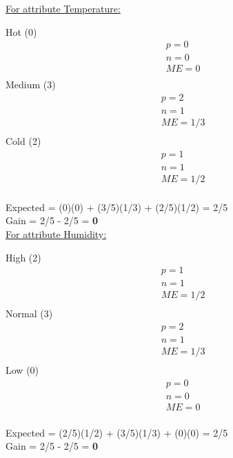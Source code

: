 \documentclass[8pt, fullpage,letterpaper]{article}
\begin{document}
\begin{enumerate}
\begin{enumerate}
\begin{enumerate}
\begin{enumerate}
\begin{itemize}
						\underline {For attribute Temperature:} 
							\vspace{-5pt}
							\begin{multicols}{3}
								Hot (0)
			 						\begin{align*}
									    	& p = 0\\
										& n = 0 \\
									    	& ME = 0\\
								      \end{align*}
								Medium (3)
			 						\begin{align*}
									    	& p = 2\\
										& n = 1 \\
									    	& ME = 1/3\\
								      \end{align*}
								Cold (2)
			 						\begin{align*}
									    	& p = 1\\
										& n = 1 \\
									    	& ME = 1/2\\
								      \end{align*}
							\end{multicols}
							\vspace{-20pt}
							Expected = (0)(0) + (3/5)(1/3) + (2/5)(1/2) = 2/5\\
							Gain = 2/5 - 2/5 = {\bf 0}\\

						\underline {For attribute Humidity:} 
							\vspace{-5pt}
							\begin{multicols}{3}
								High (2)
			 						\begin{align*}
									    	& p = 1\\
										& n = 1 \\
									    	& ME = 1/2\\
								      \end{align*}
								Normal (3)
			 						\begin{align*}
									    	& p = 2\\
										& n = 1 \\
									    	& ME = 1/3\\
								      \end{align*}
								Low (0)
			 						\begin{align*}
									    	& p = 0\\
										& n = 0 \\
									    	& ME = 0\\
								      \end{align*}
							\end{multicols}
							\vspace{-20pt}
							Expected = (2/5)(1/2) + (3/5)(1/3) + (0)(0) = 2/5\\
							Gain = 2/5 - 2/5 = {\bf 0}\\


\end{itemize}
\end{enumerate}
\end{enumerate}
\end{enumerate}
\end{enumerate}
\end{document}
